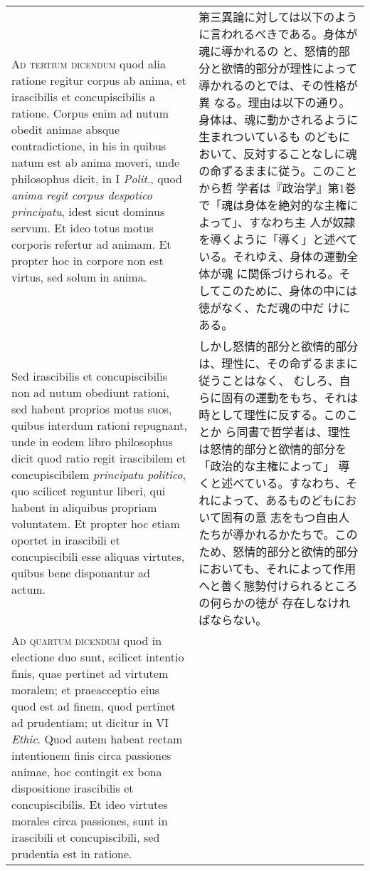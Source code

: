 \documentclass[10pt]{jsarticle}
\begin{document}
\begin{longtable}{p{21em}p{21em}}
\\



{\scshape Ad tertium dicendum} quod alia ratione regitur corpus ab
anima, et irascibilis et concupiscibilis a ratione. Corpus enim ad
nutum obedit animae absque contradictione, in his in quibus natum est
ab anima moveri, unde philosophus dicit, in I {\itshape Polit}., quod
{\itshape anima regit corpus despotico principatu}, idest sicut
dominus servum. Et ideo totus motus corporis refertur ad animam. Et
propter hoc in corpore non est virtus, sed solum in anima. 



&

第三異論に対しては以下のように言われるべきである。身体が魂に導かれるの
と、怒情的部分と欲情的部分が理性によって導かれるのとでは、その性格が異
なる。理由は以下の通り。身体は、魂に動かされるように生まれついているも
のどもにおいて、反対することなしに魂の命ずるままに従う。このことから哲
学者は『政治学』第1巻で「魂は身体を絶対的な主権によって」、すなわち主
人が奴隷を導くように「導く」と述べている。それゆえ、身体の運動全体が魂
に関係づけられる。そしてこのために、身体の中には徳がなく、ただ魂の中だ
けにある。

\\


Sed
irascibilis et concupiscibilis non ad nutum obediunt rationi, sed
habent proprios motus suos, quibus interdum rationi repugnant, unde in
eodem libro philosophus dicit quod ratio regit irascibilem et
concupiscibilem {\itshape principatu politico}, quo scilicet reguntur
liberi, qui habent in aliquibus propriam voluntatem. Et propter hoc
etiam oportet in irascibili et concupiscibili esse aliquas virtutes,
quibus bene disponantur ad actum.


&

しかし怒情的部分と欲情的部分は、理性に、その命ずるままに従うことはなく、
むしろ、自らに固有の運動をもち、それは時として理性に反する。このことか
ら同書で哲学者は、理性は怒情的部分と欲情的部分を「政治的な主権によって」
導くと述べている。すなわち、それによって、あるものどもにおいて固有の意
志をもつ自由人たちが導かれるかたちで。このため、怒情的部分と欲情的部分
においても、それによって作用へと善く態勢付けられるところの何らかの徳が
存在しなければならない。

\\

{\scshape Ad quartum dicendum} quod in electione duo sunt, scilicet
intentio finis, quae pertinet ad virtutem moralem; et praeacceptio
eius quod est ad finem, quod pertinet ad prudentiam; ut dicitur in VI
{\itshape Ethic}. Quod autem habeat rectam intentionem finis circa
passiones animae, hoc contingit ex bona dispositione irascibilis et
concupiscibilis. Et ideo virtutes morales circa passiones, sunt in
irascibili et concupiscibili, sed prudentia est in ratione.


\end{longtable}
\end{document}
